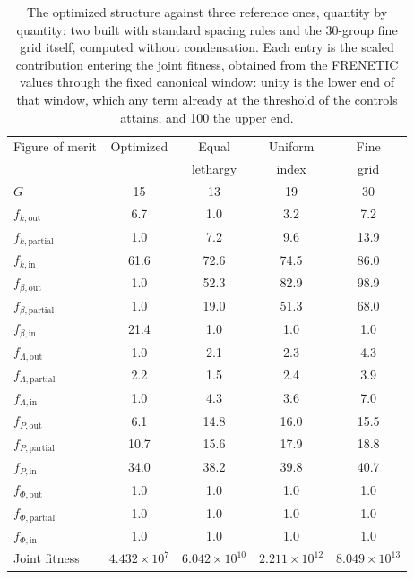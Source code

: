 \begin{table}[htbp]
\centering
\caption[The optimized structure against three reference ones]{The optimized
structure against three reference ones, quantity by quantity: two built with
standard spacing rules and the 30-group fine grid itself, computed without
condensation. Each entry is the
scaled contribution entering the joint fitness, obtained from the FRENETIC
values through the fixed canonical window: unity is the lower end of that
window, which any term already at the threshold of the controls attains, and 100
the upper end.}
\label{eg:tab:standard}
\begin{tabular}{lcccc}
\toprule
Figure of merit & Optimized & Equal & Uniform & Fine \\
     &  & lethargy & index & grid \\
    $G$ & 15 & 13 & 19 & 30 \\ \midrule
    $f_{k,\mathrm{out}}$ & 6.7 & 1.0 & 3.2 & 7.2 \\
    $f_{k,\mathrm{partial}}$ & 1.0 & 7.2 & 9.6 & 13.9 \\
    $f_{k,\mathrm{in}}$ & 61.6 & 72.6 & 74.5 & 86.0 \\
    $f_{\beta,\mathrm{out}}$ & 1.0 & 52.3 & 82.9 & 98.9 \\
    $f_{\beta,\mathrm{partial}}$ & 1.0 & 19.0 & 51.3 & 68.0 \\
    $f_{\beta,\mathrm{in}}$ & 21.4 & 1.0 & 1.0 & 1.0 \\
    $f_{\Lambda,\mathrm{out}}$ & 1.0 & 2.1 & 2.3 & 4.3 \\
    $f_{\Lambda,\mathrm{partial}}$ & 2.2 & 1.5 & 2.4 & 3.9 \\
    $f_{\Lambda,\mathrm{in}}$ & 1.0 & 4.3 & 3.6 & 7.0 \\
    $f_{P,\mathrm{out}}$ & 6.1 & 14.8 & 16.0 & 15.5 \\
    $f_{P,\mathrm{partial}}$ & 10.7 & 15.6 & 17.9 & 18.8 \\
    $f_{P,\mathrm{in}}$ & 34.0 & 38.2 & 39.8 & 40.7 \\
    $f_{\Phi,\mathrm{out}}$ & 1.0 & 1.0 & 1.0 & 1.0 \\
    $f_{\Phi,\mathrm{partial}}$ & 1.0 & 1.0 & 1.0 & 1.0 \\
    $f_{\Phi,\mathrm{in}}$ & 1.0 & 1.0 & 1.0 & 1.0 \\
\midrule
    Joint fitness & $4.432\times10^{7}$ & $6.042\times10^{10}$ & $2.211\times10^{12}$ & $8.049\times10^{13}$ \\
\bottomrule
\end{tabular}
\end{table}


